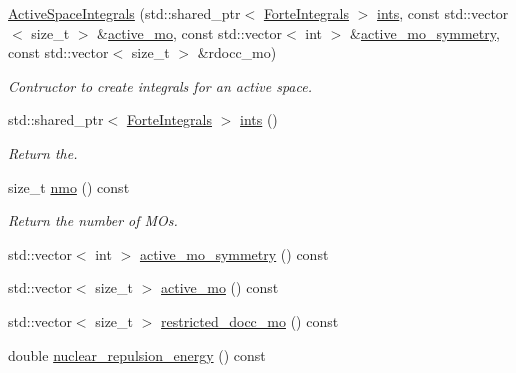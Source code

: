 \begin{DoxyCompactItemize}
\item 
\mbox{\hyperlink{classforte_1_1_active_space_integrals_a0b136807e7e7c9aa516d4db75c9f6fd8}{Active\+Space\+Integrals}} (std\+::shared\+\_\+ptr$<$ \mbox{\hyperlink{classforte_1_1_forte_integrals}{Forte\+Integrals}} $>$ \mbox{\hyperlink{classforte_1_1_active_space_integrals_a8942409ee10fb0edf1e3905eda18874e}{ints}}, const std\+::vector$<$ size\+\_\+t $>$ \&\mbox{\hyperlink{classforte_1_1_active_space_integrals_a6f5bb9340f7f6d8ad923e71110851abe}{active\+\_\+mo}}, const std\+::vector$<$ int $>$ \&\mbox{\hyperlink{classforte_1_1_active_space_integrals_a8a3db27eab08b1be6d123ec2609f414c}{active\+\_\+mo\+\_\+symmetry}}, const std\+::vector$<$ size\+\_\+t $>$ \&rdocc\+\_\+mo)
\begin{DoxyCompactList}\small\item\em Contructor to create integrals for an active space. \end{DoxyCompactList}\item 
std\+::shared\+\_\+ptr$<$ \mbox{\hyperlink{classforte_1_1_forte_integrals}{Forte\+Integrals}} $>$ \mbox{\hyperlink{classforte_1_1_active_space_integrals_a8942409ee10fb0edf1e3905eda18874e}{ints}} ()
\begin{DoxyCompactList}\small\item\em Return the. \end{DoxyCompactList}\item 
size\+\_\+t \mbox{\hyperlink{classforte_1_1_active_space_integrals_a9b282d6339c5d9d58b9068c673c30386}{nmo}} () const
\begin{DoxyCompactList}\small\item\em Return the number of M\+Os. \end{DoxyCompactList}\item 
std\+::vector$<$ int $>$ \mbox{\hyperlink{classforte_1_1_active_space_integrals_a8a3db27eab08b1be6d123ec2609f414c}{active\+\_\+mo\+\_\+symmetry}} () const
\item 
std\+::vector$<$ size\+\_\+t $>$ \mbox{\hyperlink{classforte_1_1_active_space_integrals_a6f5bb9340f7f6d8ad923e71110851abe}{active\+\_\+mo}} () const
\item 
std\+::vector$<$ size\+\_\+t $>$ \mbox{\hyperlink{classforte_1_1_active_space_integrals_a2f8581b9313b07abf073a42acf53c95d}{restricted\+\_\+docc\+\_\+mo}} () const
\item 
double \mbox{\hyperlink{classforte_1_1_active_space_integrals_aa7f55e243730026dc330f202d731934e}{nuclear\+\_\+repulsion\+\_\+energy}} () const

\end{DoxyCompactItemize}
